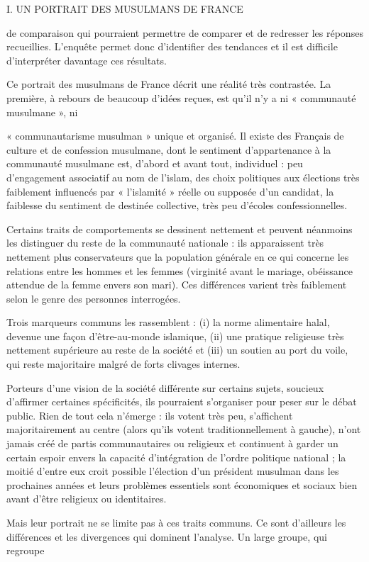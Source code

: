 I. UN PORTRAIT DES MUSULMANS DE FRANCE

de comparaison qui pourraient permettre de comparer et de redresser les
réponses recueillies. L'enquête permet donc d'identifier des tendances
et il est difficile d'interpréter davantage ces résultats.

Ce portrait des musulmans de France décrit une réalité très contrastée.
La première, à rebours de beaucoup d'idées reçues, est qu'il n'y a ni «
communauté musulmane », ni

« communautarisme musulman » unique et organisé. Il existe des Français
de culture et de confession musulmane, dont le sentiment d'appartenance
à la communauté musulmane est, d'abord et avant tout, individuel : peu
d'engagement associatif au nom de l'islam, des choix politiques aux
élections très faiblement influencés par « l'islamité » réelle ou
supposée d'un candidat, la faiblesse du sentiment de destinée
collective, très peu d'écoles confessionnelles.

Certains traits de comportements se dessinent nettement et peuvent
néanmoins les distinguer du reste de la communauté nationale : ils
apparaissent très nettement plus conservateurs que la population
générale en ce qui concerne les relations entre les hommes et les femmes
(virginité avant le mariage, obéissance attendue de la femme envers son
mari). Ces différences varient très faiblement selon le genre des
personnes interrogées.

Trois marqueurs communs les rassemblent : (i) la norme alimentaire
halal, devenue une façon d'être-au-monde islamique, (ii) une pratique
religieuse très nettement supérieure au reste de la société et (iii) un
soutien au port du voile, qui reste majoritaire malgré de forts clivages
internes.

Porteurs d'une vision de la société différente sur certains sujets,
soucieux d'affirmer certaines spécificités, ils pourraient s'organiser
pour peser sur le débat public. Rien de tout cela n'émerge : ils votent
très peu, s'affichent majoritairement au centre (alors qu'ils votent
traditionnellement à gauche), n'ont jamais créé de partis communautaires
ou religieux et continuent à garder un certain espoir envers la capacité
d'intégration de l'ordre politique national ; la moitié d'entre eux
croit possible l'élection d'un président musulman dans les prochaines
années et leurs problèmes essentiels sont économiques et sociaux bien
avant d'être religieux ou identitaires.

Mais leur portrait ne se limite pas à ces traits communs. Ce sont
d'ailleurs les différences et les divergences qui dominent l'analyse. Un
large groupe, qui regroupe

